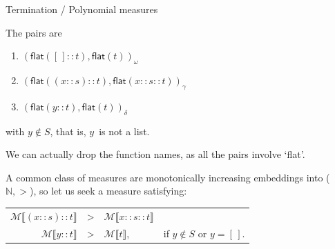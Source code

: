 \documentclass[compress,dvipdfmx]{beamer}
\newcommand\fun[1]{\textsf{#1}}
\newcommand\el{[\,]}
\newcommand\cons[2]{{#1}\!::\!{#2}}
\newcommand\measure[1]{\mathcal{M}\llbracket{#1}\rrbracket}
\begin{document}
%
\begin{frame}{Termination / Polynomial measures}

  The pairs are
  \begin{enumerate}

    \item \((\fun{flat}(\cons{\el}{t}), \fun{flat}(t))_\omega\)

    \item \((\fun{flat}(\cons{(\cons{x}{s})}{t}),
      \fun{flat}(\cons{x}{\cons{s}{t}}))_\gamma\)

    \item \((\fun{flat}(\cons{y}{t}), \fun{flat}(t))_\delta\)

  \end{enumerate}
  with \(y \not\in S\), that is, \(y\)~is not a list.

  \bigskip

  We can actually drop the function names, as all the pairs involve
  `\fun{flat}'.

  \bigskip

  A common class of measures are monotonically increasing embeddings
  into (\(\mathbb{N},>\)), so let us seek a measure satisfying:
  \begin{center}
    \begin{tabular}{r@{\;\,}c@{\;}ll}
      \(\measure{\cons{(\cons{x}{s})}{t}}\) & > &
      \(\measure{\cons{x}{\cons{s}{t}}}\)\\
      \(\measure{\cons{y}{t}}\) & > & \(\measure{t}\),
      & if \(y \not\in S\) or \(y=\el\).
    \end{tabular}
  \end{center}

\end{frame}
\end{document}
